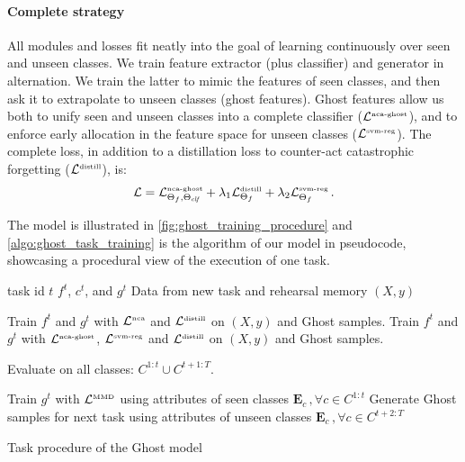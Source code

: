 \paragraph{Complete strategy} All modules and losses fit neatly into the goal of learning
continuously over seen and unseen classes. We train feature extractor (plus classifier) and
generator in alternation. We train the latter to mimic the features of seen classes, and then ask it
to extrapolate to unseen classes (ghost features). Ghost features allow us both to unify seen and
unseen classes into a complete classifier ($\mathcal{L}^\text{\tiny{nca-ghost}}$), and to enforce early
allocation in the feature space for unseen classes ($\mathcal{L}^\text{\tiny{svm-reg}}$). The complete
loss, in addition to a distillation loss to counter-act catastrophic forgetting
($\mathcal{L}^\text{\tiny{distill}}$), is:
%
\begin{equation}
    \mathcal{L} = \mathcal{L}^\text{\tiny{nca-ghost}}_{\Theta_f,\Theta_{\textit{clf}}} + \lambda_1 \mathcal{L}^\text{\tiny{distill}}_{\Theta_f} + \lambda_2 \mathcal{L}^\text{\tiny{svm-reg}}_{\Theta_f}\,.
    \label{eq:ghost_loss}
\end{equation}
%

The model is illustrated in \autoref{fig:ghost_training_procedure} and \autoref{algo:ghost_task_training} is the
algorithm of our model in pseudocode, showcasing a procedural view of the execution of one task.

\begin{algorithm}
    \begin{algorithmic}[1]
        \Require
        \Statex task id $t$
        \Statex $f^t$, $c^t$, and $g^t$
        \Statex Data from new task and rehearsal memory $(X, y)$

         \State Train $f^t$ and $g^t$ with $\mathcal{L}^\text{\tiny{nca}}$
        and $\mathcal{L}^\text{\tiny{distill}}$ on $(X, y)$ and Ghost samples. \Else \State Train $f^t$ and $g^t$
        with $\mathcal{L}^\text{\tiny{nca-ghost}}$, $\mathcal{L}^\text{\tiny{svm-reg}}$ and $\mathcal{L}^\text{\tiny{distill}}$
        on $(X, y)$ and Ghost samples. \EndIf

        \State Evaluate on all classes: $C^{1:t} \cup C^{t+1:T}$.

         \State Train $g^t$ with $\mathcal{L}^\text{\tiny{MMD}}$ using attributes of
        seen classes $\mathbf{E}_{c} \,, \forall c \in C^{1:t}$ \State Generate Ghost samples for next
        task using attributes of unseen classes $\mathbf{E}_{c} \,, \forall c \in C^{t+2:T}$ \EndIf
    \end{algorithmic}
    \caption{Task procedure of the Ghost model}
    \label{algo:ghost_task_training}
\end{algorithm}



